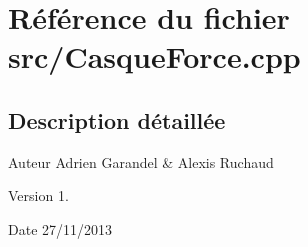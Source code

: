 \section{Référence du fichier src/\-Casque\-Force.cpp}
\label{_casque_force_8cpp}


\subsection{Description détaillée}
\begin{DoxyAuthor}{Auteur}
Adrien Garandel \& Alexis Ruchaud 
\end{DoxyAuthor}
\begin{DoxyVersion}{Version}
1. 
\end{DoxyVersion}
\begin{DoxyDate}{Date}
27/11/2013 
\end{DoxyDate}
